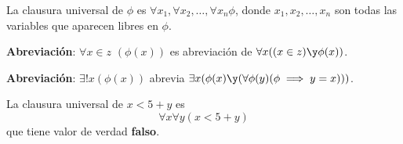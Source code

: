 \begin{defn}
	La clausura universal de $\phi$ es $\forall x_1, \forall x_2,\hdots, \forall x_n \phi$, donde $x_1, x_2, \hdots, x_n$ son todas las variables que aparecen libres en $\phi$.

	\textbf{Abreviación}: $\forall x\in z$ $(\phi(x))$ es abreviación de $\forall x ((x\in z) \y \phi (x))$.

	\textbf{Abreviación}: $\exists ! x(\phi (x))$ abrevia $\exists x(\phi (x) \y (\forall \phi(y) (\phi \implies y = x)))$.
\end{defn}

\begin{example}
	La clausura universal de $x < 5 + y$ es $$\forall x\forall y (x < 5 + y)$$ que tiene valor de verdad \textbf{falso}.
\end{example}

